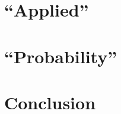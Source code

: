 \documentclass[a4paper,12pt,twoside]{report}
\begin{document}





\part{``Applied''}






\part{``Probability''}






\part{Conclusion}




% 


%
\end{document}
